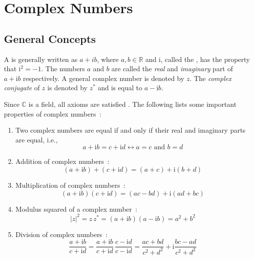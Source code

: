 \section{Complex Numbers}

\subsection{General Concepts}

A  is generally written as $a+ib$, where $a, b\in\mathbb{R}$ and $\mathrm{i}$, called the ,
has the property that $\mathrm{i}^2=-1$.  The numbers $a$ and $b$ are called the \textit{real} and \textit{imaginary} part of $a+\mathrm{i}b$ respectively.
A general complex number is denoted by $z$.  The \textit{complex conjugate} of $z$ is denoted by $z^{\ast}$ and is equal to $a-\mathrm{i}b$.

\noindent Since $\mathbb{C}$ is a field, all axioms are satisfied .  The following lists some important properties of complex numbers~:
\begin{enumerate}
\item Two complex numbers are equal if and only if their real and imaginary parts are equal, i.e.,
\begin{equation}
a+\mathrm{i}b=c+\mathrm{i}d \leftrightarrow a=c\text{ and }b=d
\end{equation}

\item Addition of complex numbers~:
\begin{equation}
(a+\mathrm{i}b)+(c+\mathrm{i}d)=(a+c)+\mathrm{i}(b+d)
\end{equation}

\item Multiplication of complex numbers~:
\begin{equation}
(a+\mathrm{i}b)(c+\mathrm{i}d)=(ac-bd)+\mathrm{i}(ad+bc)
\end{equation}

\item Modulus squared of a complex number~:
\begin{equation}
\vert z\vert^2=z\,z^{\ast}=(a+\mathrm{i}b)(a-\mathrm{i}b)=a^2+b^2
\end{equation}

\item Division of complex numbers~:
\begin{equation}
\frac{a+\mathrm{i}b}{c+\mathrm{i}d}=\frac{a+\mathrm{i}b}{c+\mathrm{i}d}\,\frac{c-\mathrm{i}d}{c-\mathrm{i}d}=
\frac{ac+bd}{c^2+d^2}+\mathrm{i}\frac{bc-ad}{c^2+d^2}
\end{equation}
\end{enumerate}

